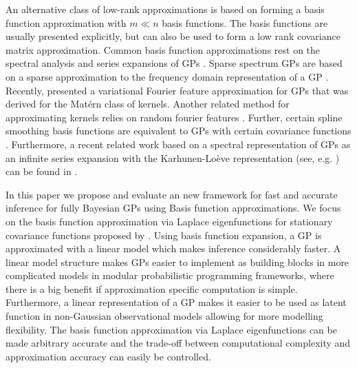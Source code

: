 \documentclass[onecolumn,a4paper,11pt]{article}
\begin{document}
An alternative class of low-rank approximations is based on forming a basis function approximation with $m \ll n$ basis functions. The basis functions are usually presented explicitly, but can also be used to form a low rank covariance matrix approximation. Common basis function approximations rest on the spectral analysis and series expansions of GPs \citep{loeve1977probability,trees1968detection,adler1981geometry,cramer2013stationary}.
Sparse spectrum GPs are based on a sparse approximation to the frequency domain representation of a GP \citep{lazaro2010sparse,quia2010sparse,gal2015improving}. Recently, \cite{hensman2017variational} presented a variational Fourier feature approximation for GPs that was derived for the Mat{\'e}rn class of kernels. Another related method for approximating kernels relies on random fourier features \citep{rahimi2008random,rahimi2009weighted}.
Further, certain spline smoothing basis functions are equivalent to GPs with certain covariance functions \citep{wahba1990spline,Furrer+Nychka:2007}.
Furthermore, a recent related work based on a spectral representation of GPs as an infinite series expansion with the Karhunen-Loève representation (see, e.g. \cite{grenander1981abstract}) can be found in \cite{JSSv090i10}.


In this paper we propose and evaluate an new framework for fast and accurate inference for fully Bayesian GPs using Basis function approximations. We focus on the basis function approximation via Laplace eigenfunctions for stationary covariance functions proposed by \citet{solin2018hilbert}. Using basis function expansion, a GP is approximated with a linear model which makes inference considerably faster. A linear model structure makes GPs easier to implement as building blocks in more complicated models in modular probabilistic programming frameworks, where there is a big benefit if approximation specific computation is simple. Furthermore, a linear representation of a GP makes it easier to be used as latent function
in non-Gaussian observational models allowing for more modelling flexibility. The basis function approximation via Laplace eigenfunctions can be made arbitrary accurate and the trade-off between computational complexity and approximation accuracy can easily be controlled.
\end{document}
